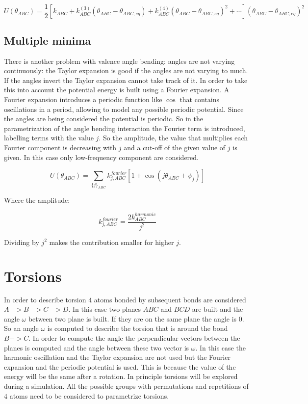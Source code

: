 $$U(\theta_{ABC}) = \frac{1}{2}[k_{ABC}+k^{(3)}_{ABC}(\theta_{ABC}-\theta_{ABC,eq})+k^{(4)}_{ABC}(\theta_{ABC}-\theta_{ABC,eq})^2+\cdots](\theta_{ABC}-\theta_{ABC, eq})^2$$

	\subsection{Multiple minima}
	There is another problem with valence angle bending: angles are not varying continuously: the Taylor expansion is good if the angles are not varying to much.
	If the angles invert the Taylor expansion cannot take track of it.
	In order to take this into account the potential energy is built using a Fourier expansion.
	A Fourier expansion introduces a periodic function like $\cos$ that contains oscillations in a period, allowing to model any possible periodic potential.
	Since the angles are being considered the potential is periodic.
	So in the parametrization of the angle bending interaction the Fourier term is introduced, labelling terms with the value $j$.
	So the amplitude, the value that multiplies each Fourier component is decreasing with $j$ and a cut-off of the given value of $j$ is given.
	In this case only low-frequency component are considered.

	$$U(\theta_{ABC}) = \sum\limits_{\{j\}_{ABC}}k^{fourier}_{j,ABC}[1+\cos(j\theta_{ABC}+\psi_j)]$$

	Where the amplitude:

	$$k_{j, ABC}^{fourier} = \frac{2k^{harmonic}_{ABC}}{j^2}$$

	Dividing by $j^2$ makes the contribution smaller for higher $j$.

\section{Torsions}
In order to describe torsion $4$ atoms bonded by subsequent bonds are considered $A->B->C->D$.
In this case two planes $ABC$ and $BCD$ are built and the angle $\omega$ between two plane is built.
If they are on the same plane the angle is $0$.
So an angle $\omega$ is computed to describe the torsion that is around the bond $B->C$.
In order to compute the angle the perpendicular vectors between the planes is computed and the angle between these two vector is $\omega$.
In this case the harmonic oscillation and the Taylor expansion are not used but the Fourier expansion and the periodic potential is used.
This is because the value of the energy will be the same after a rotation.
In principle torsions will be explored during a simulation.
All the possible groups with permutations and repetitions of $4$ atoms need to be considered to parametrize torsions.

